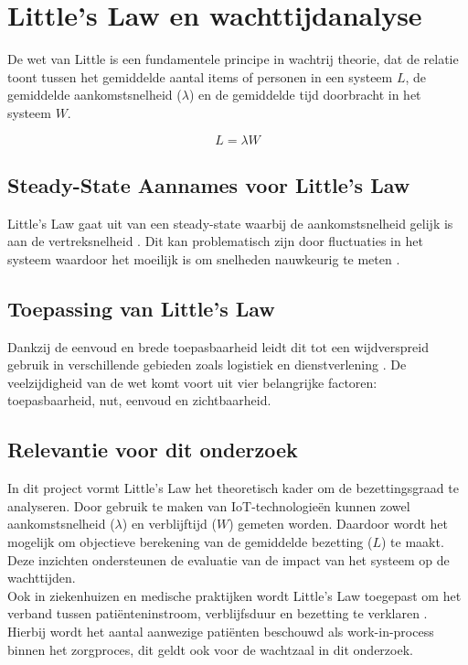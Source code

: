 \section{Little’s Law en wachttijdanalyse}
De wet van Little is een fundamentele principe in wachtrij theorie, dat de relatie toont tussen het gemiddelde aantal items of personen in een systeem \(L\), de gemiddelde aankomstsnelheid (\( \lambda \)) en de gemiddelde tijd doorbracht in het systeem \(W\). \autocite{Little2008, Wolff2011}

\[
L = \lambda W
\]

\subsection{Steady-State Aannames voor Little's Law}
Little's Law gaat uit van een steady-state \autocite{Walsh2007} waarbij de aankomstsnelheid gelijk is aan de vertreksnelheid \autocite{Marks2019}. Dit kan problematisch zijn door fluctuaties in het systeem \autocite{Walsh2007} waardoor het moeilijk is om snelheden nauwkeurig te meten \autocite{Hayati2017}.

\subsection{Toepassing van Little’s Law}
Dankzij de eenvoud en brede toepasbaarheid leidt dit tot een wijdverspreid gebruik in verschillende gebieden zoals logistiek en dienstverlening \autocite{SimchiLevi2011}. De veelzijdigheid van de wet komt voort uit vier belangrijke factoren: toepasbaarheid, nut, eenvoud en zichtbaarheid. \autocite{Potter2020}

\subsection{Relevantie voor dit onderzoek}
In dit project vormt Little’s Law het theoretisch kader om de bezettingsgraad te analyseren. Door gebruik te maken van IoT-technologieën kunnen zowel aankomstsnelheid (\( \lambda \)) en verblijftijd (\(W\)) gemeten worden. Daardoor wordt het mogelijk om objectieve berekening van de gemiddelde bezetting (\(L\)) te maakt. Deze inzichten ondersteunen de evaluatie van de impact van het systeem op de wachttijden.  \\ 

Ook in ziekenhuizen en medische praktijken wordt Little’s Law toegepast om het verband tussen patiënteninstroom, verblijfsduur en bezetting te verklaren \autocite{Aahlin2022}. Hierbij wordt het aantal aanwezige patiënten beschouwd als work-in-process binnen het zorgproces, dit geldt ook voor de wachtzaal in dit onderzoek.

